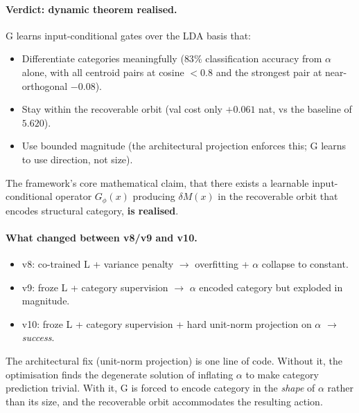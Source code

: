 \documentclass[11pt, a4paper]{article}
\theoremstyle{plain}
\theoremstyle{definition}
\theoremstyle{remark}
\begin{document}
\paragraph{Verdict: dynamic theorem realised.}
G learns input-conditional gates over the LDA basis that:
\begin{itemize}[nosep]
\item Differentiate categories meaningfully ($83\%$ classification accuracy from $\alpha$ alone, with all centroid pairs at cosine $< 0.8$ and the strongest pair at near-orthogonal $-0.08$).
\item Stay within the recoverable orbit (val cost only $+0.061$ nat, vs the baseline of $5.620$).
\item Use bounded magnitude (the architectural projection enforces this; G learns to use direction, not size).
\end{itemize}
The framework's core mathematical claim, that there exists a learnable input-conditional operator $G_\phi(x)$ producing $\delta M(x)$ in the recoverable orbit that encodes structural category, \textbf{is realised}.

\paragraph{What changed between v8/v9 and v10.}
\begin{itemize}[nosep]
\item v8: co-trained L + variance penalty $\to$ overfitting + $\alpha$ collapse to constant.
\item v9: froze L + category supervision $\to$ $\alpha$ encoded category but exploded in magnitude.
\item v10: froze L + category supervision + hard unit-norm projection on $\alpha$ $\to$ \emph{success}.
\end{itemize}
The architectural fix (unit-norm projection) is one line of code.
Without it, the optimisation finds the degenerate solution of inflating $\alpha$ to make category prediction trivial.
With it, G is forced to encode category in the \emph{shape} of $\alpha$ rather than its size, and the recoverable orbit accommodates the resulting action.
\end{document}
